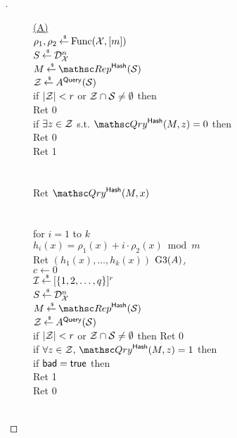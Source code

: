 \begin{proof}[]
\begin{figure}
{
{
\underline{(A)}\\
$\rho_1,\rho_2 {\:\stackrel{{\scriptscriptstyle \hspace{0.2em}\$}} {\leftarrow}\:} \mathrm{Func}({\cal X},[m])$\\
$S {\:\stackrel{{\scriptscriptstyle \hspace{0.2em}\$}} {\leftarrow}\:} \mathcal{D}_{{\cal X}}^{n}$\\
$M \getsr \Rep^{\HashOracle}(\calS)$\\
${\cal Z} {\:\stackrel{{\scriptscriptstyle \hspace{0.2em}\$}} {\leftarrow}\:} A^{\mathsf{Query}}({\cal S})$\\
if $|{\cal Z}| < r$ or ${\cal Z} \cap {\cal S} \neq \emptyset$ then \\
\nudge Ret 0\\
if $\exists z \in {\cal Z}$ s.t. $\Qry^{\HashOracle}(M,z)=0$ then\\
\nudge Ret 0\\
Ret 1\\\\
%
\\
Ret $\Qry^{\HashOracle}(M,x)$\\\\
%
\\
for $i=1$ to $k$\\
\nudge $h_i(x) = \rho_1(x)+i \cdot \rho_2(x) \bmod m$\\
Ret $\left(h_1(x),\ldots,h_k(x)\right)$
}
{
\underline{{$\text{G3}(A)$},}\\
$c \gets 0$\\
$\mathcal{I}{\:\stackrel{{\scriptscriptstyle \hspace{0.2em}\$}} {\leftarrow}\:} [\{1,2,\ldots,q\}]^r$\\
$S {\:\stackrel{{\scriptscriptstyle \hspace{0.2em}\$}} {\leftarrow}\:} \mathcal{D}_{{\cal X}}^{n}$\\
$M \getsr \Rep^{\HashOracle}(\calS)$\\
${\cal Z} {\:\stackrel{{\scriptscriptstyle \hspace{0.2em}\$}} {\leftarrow}\:} A^{\mathsf{Query}}({\cal S})$\\
if $|{\cal Z}| < r$ or ${\cal Z} \cap {\cal S} \neq \emptyset$ then Ret 0\\
if $\forall z \in \calZ,\,\Qry^{\HashOracle}(M,z)=1$ then \\
\nudge if $\mathsf{bad}=\mathsf{true}$ then \\
\nudge Ret 1\\
Ret 0\\\\
}}
\end{figure}
\end{proof}
